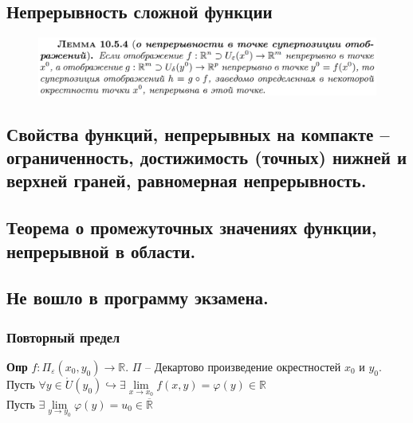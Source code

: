 \documentclass{article}
\newcommand{\R}{\mathbb{R}}
\newcommand{\bb}{\textbf}
\begin{document}
\subsection{Непрерывность сложной функции}
\begin{figure}[h!]
    \centering
    \includegraphics[width=\textwidth]{28.png}
    \vspace{-1cm}
\end{figure}


\newpage
\subsection{Свойства функций, непрерывных на компакте -- ограниченность, достижимость (точных) нижней и верхней граней, равномерная непрерывность.}

\newpage
\subsection{Теорема о промежуточных значениях функции, непрерывной в области.}

\newpage
\subsection{Не вошло в программу экзамена.}
\subsubsection{Повторный предел}
\bb{Опр} $f: \Pi_\varepsilon(x_0, y_0) \to \R $. $\Pi$ -- Декартово произведение окрестностей $x_0$ и $y_0$. \\ 
Пусть $\forall y \in \mathring{U}(y_0)\hookrightarrow \exists \lim\limits_{x\to x_0}f(x,y) = \varphi(y) \in \R$\\
Пусть $\exists \lim\limits_{y\to y_0} \varphi(y) = u_0 \in \overline{\R}$
\end{document}
